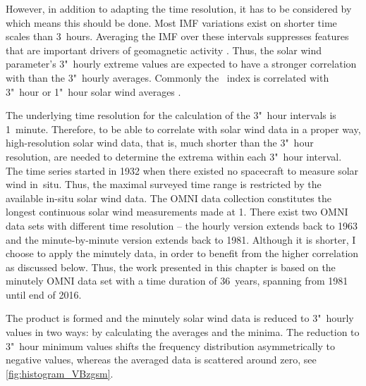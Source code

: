 However, in addition to adapting the time resolution, it has to be considered by which means this should be done. Most IMF variations exist on shorter time scales than 3~hours. Averaging the IMF over these intervals suppresses features that are important drivers of geomagnetic activity \citep{Savani2017}. Thus, the solar wind parameter's 3"~hourly extreme values are expected to have a stronger correlation with \Kp{} than the 3"~hourly averages.
Commonly the \Kp~index is correlated with 3"~hour or 1"~hour solar wind averages \citep[e.g., ][]{Newell2007,Elliott2013,Savani2017}.

The underlying time resolution for the calculation of the 3"~hour \Kp{} intervals is 1~minute. Therefore, to be able to correlate \Kp{} with solar wind data in a proper way, high-resolution solar wind data, that is, much shorter than the 3"~hour resolution, are needed to determine the extrema within each 3"~hour interval.
The \Kp{} time series started in 1932 when there existed no spacecraft to measure solar wind in~situ. Thus, the maximal surveyed time range is restricted by the available in-situ solar wind data.
The OMNI data collection constitutes the longest continuous solar wind measurements made at \SI{1}{\au}. There exist two OMNI data sets with different time resolution -- the hourly version extends back to 1963 and the minute-by-minute version extends back to 1981. Although it is shorter, I choose to apply the minutely data, in order to benefit from the higher correlation as discussed below. Thus, the work presented in this chapter is based on the minutely OMNI data set with a time duration of 36~years, spanning from 1981 until end of 2016.

The product \vBz{} is formed and the minutely solar wind data is reduced to 3"~hourly values in two ways: by calculating the averages and the minima.
The reduction to 3"~hour minimum values shifts the \vBz{} frequency distribution asymmetrically to negative values, whereas the averaged data is scattered around zero, see \autoref{fig:histogram_VBzgsm}.


